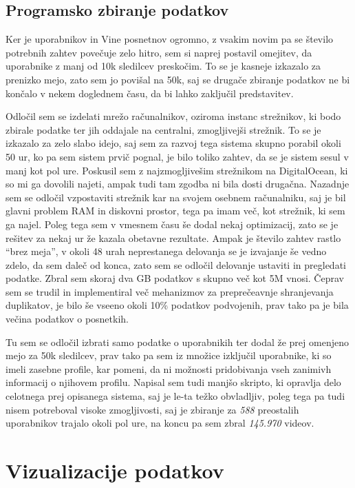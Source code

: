 \documentclass[a4paper,11pt]{article}
\begin{document}
\subsection{Programsko zbiranje podatkov}

Ker je uporabnikov in Vine posnetnov ogromno, z vsakim novim pa se število potrebnih zahtev povečuje zelo hitro, sem si naprej postavil omejitev, da uporabnike z manj od 10k sledilcev preskočim. To se je kasneje izkazalo za prenizko mejo, zato sem jo povišal na 50k, saj se drugače zbiranje podatkov ne bi končalo v nekem doglednem času, da bi lahko zaključil predstavitev.
\par
Odločil sem se izdelati mrežo računalnikov, oziroma instanc strežnikov, ki bodo zbirale podatke ter jih oddajale na centralni, zmogljivejši strežnik. To se je izkazalo za zelo slabo idejo, saj sem za razvoj tega sistema skupno porabil okoli 50 ur, ko pa sem sistem prvič pognal, je bilo toliko zahtev, da se je sistem sesul v manj kot pol ure. Poskusil sem z najzmogljivešim strežnikom na DigitalOcean, ki so mi ga dovolili najeti, ampak tudi tam zgodba ni bila dosti drugačna. Nazadnje sem se odločil vzpostaviti strežnik kar na svojem osebnem računalniku, saj je bil glavni problem RAM in diskovni prostor, tega pa imam več, kot strežnik, ki sem ga najel. Poleg tega sem v vmesnem času še dodal nekaj optimizacij, zato se je rešitev za nekaj ur že kazala obetavne rezultate. Ampak je število zahtev rastlo ``brez meja'', v okoli 48 urah neprestanega delovanja se je izvajanje še vedno zdelo, da sem daleč od konca, zato sem se odločil delovanje ustaviti in pregledati podatke. Zbral sem skoraj dva GB podatkov s skupno več kot 5M vnosi. Čeprav sem se trudil in implementiral več mehanizmov za preprečeavnje shranjevanja duplikatov, je bilo še vseeno okoli 10\% podatkov podvojenih, prav tako pa je bila večina podatkov o posnetkih.
\par
Tu sem se odločil izbrati samo podatke o uporabnikih ter dodal že prej omenjeno mejo za 50k sledilcev, prav tako pa sem iz množice izključil uporabnike, ki so imeli zasebne profile, kar pomeni, da ni možnosti pridobivanja vseh zanimivh informacij o njihovem profilu. Napisal sem tudi manjšo skripto, ki opravlja delo celotnega prej opisanega sistema, saj je le-ta težko obvladljiv, poleg tega pa tudi nisem potreboval visoke zmogljivosti, saj je zbiranje za \textit{588} preostalih uporabnikov trajalo okoli pol ure, na koncu pa sem zbral \textit{145.970} videov.

\section{Vizualizacije podatkov}
\end{document}
